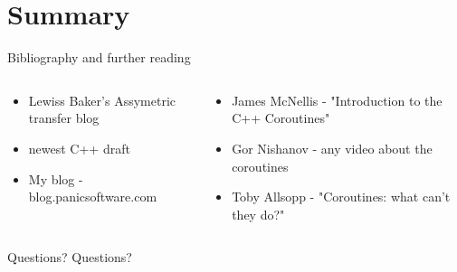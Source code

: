 \documentclass[10pt]{beamer}
\begin{document}
\section*{Summary}

\begin{frame}{Bibliography and further reading}
\begin{columns}
\begin{column}{0.48\linewidth}
	\begin{itemize}
		\item Lewiss Baker's Assymetric transfer blog
		\item newest C++ draft
		\item My blog - blog.panicsoftware.com
	\end{itemize}
\end{column}
\begin{column}{0.48\linewidth}
	\begin{itemize}
		\item James McNellis - "Introduction to the C++ Coroutines"
		\item Gor Nishanov - any video about the coroutines
		\item Toby Allsopp - "Coroutines: what can't they do?"
	\end{itemize}
\end{column}

\end{columns}
\end{frame}

\begin{frame}{Questions?}
\vfill
\centering Questions?
\vfill
\end{frame}
\end{document}
